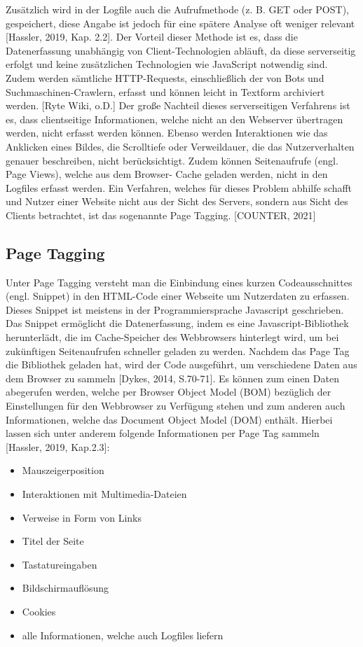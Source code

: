 Zusätzlich wird in der Logfile auch die Aufrufmethode (z. B. GET oder POST),  gespeichert, diese Angabe ist jedoch für eine spätere Analyse oft weniger relevant [Hassler, 2019, Kap. 2.2]. Der Vorteil dieser Methode ist es, dass die Datenerfassung unabhängig von Client-Technologien abläuft, da diese serverseitig erfolgt und keine zusätzlichen Technologien wie JavaScript notwendig sind. Zudem werden sämtliche HTTP-Requests, einschließlich der von Bots und Suchmaschinen-Crawlern, erfasst und können leicht in Textform archiviert werden. [Ryte Wiki, o.D.]
Der große Nachteil dieses serverseitigen Verfahrens ist es, dass clientseitige Informationen, welche nicht an den Webserver übertragen werden, nicht erfasst werden können. Ebenso werden Interaktionen wie das Anklicken eines Bildes, die Scrolltiefe oder Verweildauer, die das Nutzerverhalten genauer beschreiben, nicht berücksichtigt. Zudem können Seitenaufrufe (engl. Page Views), welche aus dem Browser- Cache geladen werden, nicht in den Logfiles erfasst werden. Ein Verfahren, welches für dieses Problem abhilfe schafft und Nutzer einer Website nicht aus der Sicht des Servers, sondern aus Sicht des Clients betrachtet, ist das sogenannte Page Tagging. [COUNTER, 2021]

\subsection{Page Tagging}
\label{sec:pagetagging}
Unter Page Tagging versteht man die Einbindung eines kurzen Codeausschnittes (engl. Snippet) in den HTML-Code einer Webseite um Nutzerdaten zu erfassen. Dieses Snippet ist meistens in der Programmiersprache Javascript geschrieben. Das Snippet ermöglicht die Datenerfassung, indem es eine Javascript-Bibliothek herunterlädt, die im Cache-Speicher des Webbrowsers hinterlegt wird, um bei zukünftigen Seitenaufrufen schneller geladen zu werden. Nachdem das Page Tag die Bibliothek geladen hat, wird der Code ausgeführt, um verschiedene Daten aus dem Browser zu sammeln [Dykes, 2014, S.70-71]. Es können zum einen Daten abegerufen werden, welche per Browser Object Model (BOM) bezüglich der Einstellungen für den Webbrowser zu Verfügung stehen und zum anderen auch Informationen, welche das Document Object Model (DOM) enthält. Hierbei lassen sich unter anderem folgende Informationen per Page Tag sammeln [Hassler, 2019, Kap.2.3]:  

\begin{itemize}
    \item Mauszeigerposition
    \item Interaktionen mit Multimedia-Dateien
    \item Verweise in Form von Links
    \item Titel der Seite
    \item Tastatureingaben
    \item Bildschirmauflösung
    \item Cookies
    \item alle Informationen, welche auch Logfiles liefern
\end{itemize}

